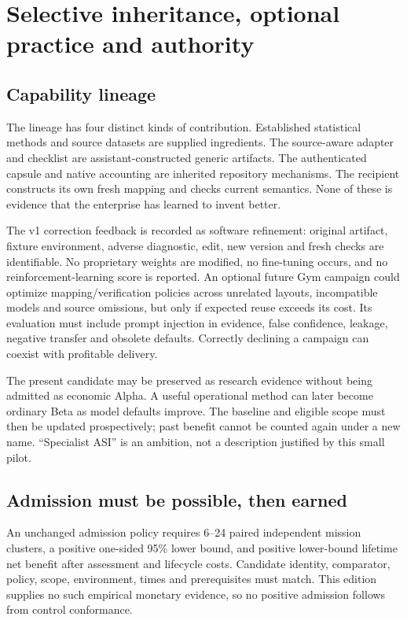 \documentclass[11pt]{article}
\begin{document}
\section{Selective inheritance, optional practice and authority}

\subsection{Capability lineage}

The lineage has four distinct kinds of contribution. Established statistical methods and source datasets are supplied ingredients. The source-aware adapter and checklist are assistant-constructed generic artifacts. The authenticated capsule and native accounting are inherited repository mechanisms. The recipient constructs its own fresh mapping and checks current semantics. None of these is evidence that the enterprise has learned to invent better.

The v1 correction feedback is recorded as software refinement: original artifact, fixture environment, adverse diagnostic, edit, new version and fresh checks are identifiable. No proprietary weights are modified, no fine-tuning occurs, and no reinforcement-learning score is reported. An optional future Gym campaign could optimize mapping/verification policies across unrelated layouts, incompatible models and source omissions, but only if expected reuse exceeds its cost. Its evaluation must include prompt injection in evidence, false confidence, leakage, negative transfer and obsolete defaults. Correctly declining a campaign can coexist with profitable delivery.

The present candidate may be preserved as research evidence without being admitted as economic Alpha. A useful operational method can later become ordinary Beta as model defaults improve. The baseline and eligible scope must then be updated prospectively; past benefit cannot be counted again under a new name. ``Specialist ASI'' is an ambition, not a description justified by this small pilot.

\subsection{Admission must be possible, then earned}

An unchanged admission policy requires 6–24 paired independent mission clusters, a positive one-sided 95\% lower bound, and positive lower-bound lifetime net benefit after assessment and lifecycle costs. Candidate identity, comparator, policy, scope, environment, times and prerequisites must match. This edition supplies no such empirical monetary evidence, so no positive admission follows from control conformance.
\end{document}

